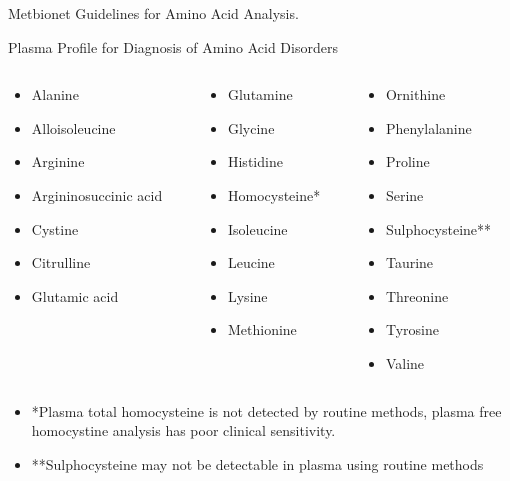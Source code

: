\documentclass[presentation, smaller]{beamer}
\begin{document}
\begin{frame}[label={sec:orgheadline4}]{Metbionet Guidelines for Amino Acid Analysis.}
\begin{block}{Plasma Profile for Diagnosis of Amino Acid Disorders}
\begin{columns}
\begin{column}{0.3\columnwidth}
\begin{itemize}
\item Alanine
\item Alloisoleucine
\item Arginine
\item Argininosuccinic acid
\item Cystine
\item Citrulline
\item Glutamic acid
\end{itemize}
\end{column}


\begin{column}{0.3\columnwidth}
\begin{itemize}
\item Glutamine
\item Glycine
\item Histidine
\item Homocysteine*
\item Isoleucine
\item Leucine
\item Lysine
\item Methionine
\end{itemize}
\end{column}
\begin{column}{0.3\columnwidth}
\begin{itemize}
\item Ornithine
\item Phenylalanine
\item Proline
\item Serine
\item Sulphocysteine**
\item Taurine
\item Threonine
\item Tyrosine
\item Valine
\end{itemize}
\end{column}
\end{columns}
\end{block}

\begin{itemize}
\item *Plasma total homocysteine is not detected by routine methods, plasma free homocystine analysis has poor clinical sensitivity.
\item **Sulphocysteine may not be detectable in plasma using routine methods
\end{itemize}
\end{frame}
\end{document}
